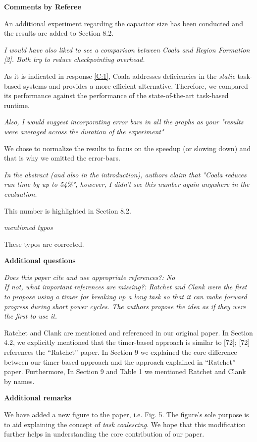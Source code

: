 \documentclass[10pt]{article}
\newcommand{\referee}[1]{
	{\item \color{OliveGreen} \emph{{#1}}}
	\label{R\therefereeCounter:\arabic{enumi}}
}
\newcommand{\response}[1]{{\color{blue} #1}}
\newenvironment{additionalQuestions}{%
\textbf{\large Additional questions}
\begin{enumerate}%
\renewcommand{\labelenumi}{\textbf{[Q:\,\arabic{enumi}]}} %
}{\end{enumerate}}
\newenvironment{editor}{%
\textbf{\large Additional remarks}
\begin{enumerate}%
\renewcommand{\labelenumi}{\textbf{[R:\,\arabic{enumi}]}} %
}{\end{enumerate}}
\newcounter{refereeCounter}
\newenvironment{responses}{%
\refstepcounter{refereeCounter}%
\textbf{\large Comments by Referee \therefereeCounter}
\begin{enumerate}%
\renewcommand{\labelenumi}{\textbf{[C:\,\arabic{enumi}]}} %
}{\end{enumerate}}
\begin{document}
\begin{responses}
\response{An additional experiment regarding the capacitor size has been conducted and the results are added to Section 8.2.}

\referee{I would have also liked to see a comparison between Coala and Region Formation [2]. Both try to reduce checkpointing overhead.}

\response{As it is indicated in response \hyperref[C:1]{[C:1]}, Coala addresses deficiencies in the \emph{static} task-based systems and provides a more efficient alternative. Therefore, we compared its performance against the performance of the state-of-the-art task-based runtime.}

\referee{Also, I would suggest incorporating error bars in all the graphs as your "results were averaged across the duration of the experiment"}

\response{We chose to normalize the results to focus on the speedup (or slowing down) and that is why we omitted the error-bars.}

\referee{In the abstract (and also in the introduction), authors claim that "Coala reduces run time by up to 54\%", however, I didn't see this number again anywhere in the evaluation.}

\response{This number is highlighted in Section 8.2.}



\referee{mentioned typos}

\response{These typos are corrected.}


\end{responses}


\begin{additionalQuestions}
\referee{Does this paper cite and use appropriate references?: No\\
If not, what important references are missing?: 
Ratchet and Clank were the first to propose using a timer for breaking up a long task so that it can make forward progress during short power cycles.  The authors propose the idea as if they were the first to use it.}

\response{Ratchet and Clank are mentioned and referenced in our original paper. 
In Section 4.2, we explicitly mentioned that the timer-based approach is similar to [72]; [72] references the ``Ratchet'' paper. 
In Section 9 we explained the core difference between our timer-based approach and the approach explained  in ``Ratchet'' paper. Furthermore, In Section 9 and Table 1 we mentioned Ratchet and Clank by names.}
\end{additionalQuestions}

\begin{editor}
\referee{}
\response{We have added a new figure to the paper, i.e. Fig. 5. The figure's sole purpose is to aid explaining the concept of \textit{task coalescing}.
We hope that this modification further helps in understanding the core contribution of our paper.}
\end{editor}
\end{document}
